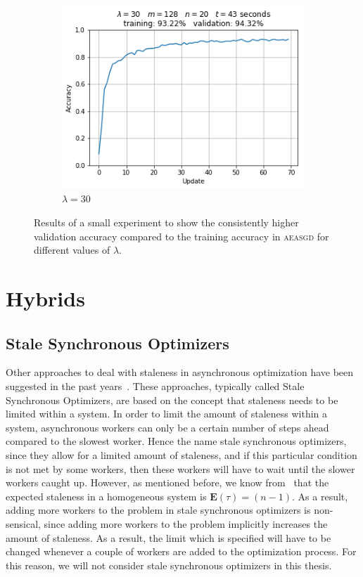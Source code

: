 \begin{figure}[H]
\begin{subfigure}{.32\textwidth}
    \includegraphics[width=\textwidth]{resources/images/aeasgd_val_30}
    \caption{$\lambda = 30$}
  \end{subfigure}
  \caption{Results of a small experiment to show the consistently higher validation accuracy compared to the training accuracy in \textsc{aeasgd} for different values of $\lambda$.}
  \label{fig:aeasgd_validation}
\end{figure}

\section{Hybrids}
\label{sec:hybrids}

\subsection{Stale Synchronous Optimizers}
\label{sec:stale_synchronous_optimizers}

Other approaches to deal with staleness in asynchronous optimization have been suggested in the past years~\cite{cipar2013solving, ho2013more}. These approaches, typically called Stale Synchronous Optimizers, are based on the concept that staleness needs to be limited within a system. In order to limit the amount of staleness within a system, asynchronous workers can only be a certain number of steps ahead compared to the slowest worker. Hence the name stale synchronous optimizers, since they allow for a limited amount of staleness, and if this particular condition is not met by some workers, then these workers will have to wait until the slower workers caught up. However, as mentioned before, we know from~\cite{implicitmomentum} that the expected staleness in a homogeneous system is $\mathbf{E}(\tau) = (n - 1)$. As a result, adding more workers to the problem in stale synchronous optimizers is non-sensical, since adding more workers to the problem implicitly increases the amount of staleness. As a result, the limit which is specified will have to be changed whenever a couple of workers are added to the optimization process. For this reason, we will not consider stale synchronous optimizers in this thesis.
